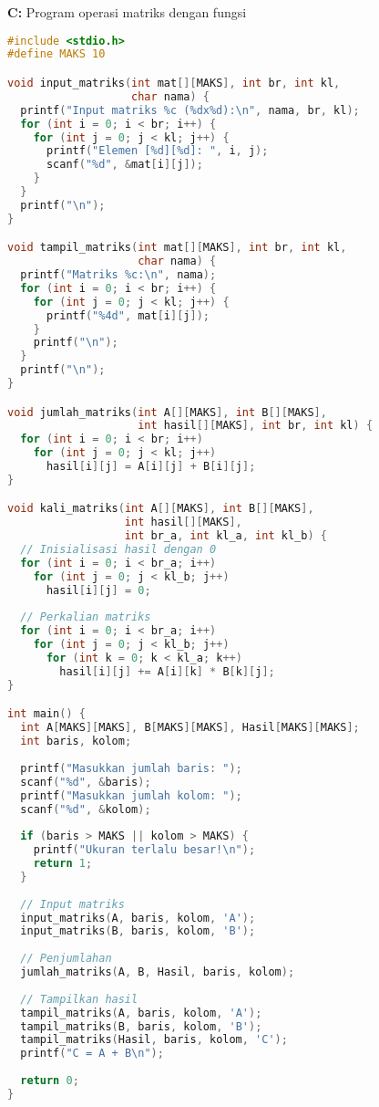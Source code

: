 \documentclass[../main.tex]{subfiles}
\begin{document}
\textbf{C:} Program operasi matriks dengan fungsi
\begin{lstlisting}[language=C, caption={Program operasi matriks di C}]
#include <stdio.h>
#define MAKS 10

void input_matriks(int mat[][MAKS], int br, int kl, 
                   char nama) {
  printf("Input matriks %c (%dx%d):\n", nama, br, kl);
  for (int i = 0; i < br; i++) {
    for (int j = 0; j < kl; j++) {
      printf("Elemen [%d][%d]: ", i, j);
      scanf("%d", &mat[i][j]);
    }
  }
  printf("\n");
}

void tampil_matriks(int mat[][MAKS], int br, int kl, 
                    char nama) {
  printf("Matriks %c:\n", nama);
  for (int i = 0; i < br; i++) {
    for (int j = 0; j < kl; j++) {
      printf("%4d", mat[i][j]);
    }
    printf("\n");
  }
  printf("\n");
}

void jumlah_matriks(int A[][MAKS], int B[][MAKS],
                    int hasil[][MAKS], int br, int kl) {
  for (int i = 0; i < br; i++)
    for (int j = 0; j < kl; j++)
      hasil[i][j] = A[i][j] + B[i][j];
}

void kali_matriks(int A[][MAKS], int B[][MAKS],
                  int hasil[][MAKS], 
                  int br_a, int kl_a, int kl_b) {
  // Inisialisasi hasil dengan 0
  for (int i = 0; i < br_a; i++)
    for (int j = 0; j < kl_b; j++)
      hasil[i][j] = 0;
  
  // Perkalian matriks
  for (int i = 0; i < br_a; i++)
    for (int j = 0; j < kl_b; j++)
      for (int k = 0; k < kl_a; k++)
        hasil[i][j] += A[i][k] * B[k][j];
}

int main() {
  int A[MAKS][MAKS], B[MAKS][MAKS], Hasil[MAKS][MAKS];
  int baris, kolom;
  
  printf("Masukkan jumlah baris: ");
  scanf("%d", &baris);
  printf("Masukkan jumlah kolom: ");
  scanf("%d", &kolom);
  
  if (baris > MAKS || kolom > MAKS) {
    printf("Ukuran terlalu besar!\n");
    return 1;
  }
  
  // Input matriks
  input_matriks(A, baris, kolom, 'A');
  input_matriks(B, baris, kolom, 'B');
  
  // Penjumlahan
  jumlah_matriks(A, B, Hasil, baris, kolom);
  
  // Tampilkan hasil
  tampil_matriks(A, baris, kolom, 'A');
  tampil_matriks(B, baris, kolom, 'B');
  tampil_matriks(Hasil, baris, kolom, 'C');
  printf("C = A + B\n");
  
  return 0;
}
\end{lstlisting}
\end{document}
